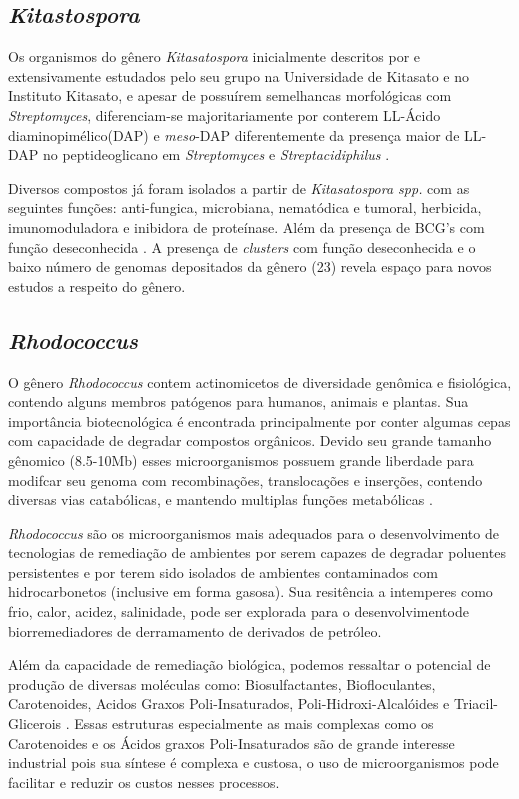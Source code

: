 \subsection{\textit{Kitastospora}}
Os organismos do gênero \textit{Kitasatospora} inicialmente descritos por  e extensivamente estudados pelo seu grupo na Universidade de Kitasato
e no Instituto Kitasato, e apesar de possuírem semelhancas morfológicas com \textit{Streptomyces}, 
diferenciam-se majoritariamente por conterem  LL-Ácido diaminopimélico(DAP) e \textit{meso}-DAP diferentemente da presença
maior de LL-DAP no peptideoglicano em \textit{Streptomyces} e \textit{Streptacidiphilus} \cite{yun2020genome}.

Diversos compostos já foram isolados a partir de \textit{Kitasatospora spp.} com as seguintes funções:
anti-fungica, microbiana, nematódica e tumoral, herbicida, imunomoduladora e inibidora de proteínase. Além da presença
de BCG's com função deseconhecida \cite{takahashi2017genus}. A presença de \textit{clusters} com função deseconhecida
e o baixo número de genomas depositados da gênero (23) \cite{schoch2020ncbi} revela espaço para novos estudos a respeito
do gênero. 

\subsection{\textit{Rhodococcus}}
O gênero \textit{Rhodococcus} contem actinomicetos de diversidade genômica e fisiológica,
contendo alguns membros patógenos para humanos, animais e plantas. Sua importância biotecnológica
é encontrada principalmente por conter algumas cepas com capacidade de degradar compostos orgânicos.
Devido seu grande tamanho gênomico (8.5-10Mb) esses microorganismos possuem grande liberdade
para modifcar seu genoma com recombinações, translocações e inserções, contendo diversas vias catabólicas,
e mantendo multiplas funções metabólicas \cite{cappelletti2019}.

\textit{Rhodococcus} são os microorganismos mais adequados para o desenvolvimento de
tecnologias de remediação de ambientes por serem capazes de degradar poluentes persistentes e por
terem sido isolados de ambientes contaminados com hidrocarbonetos 
(inclusive em forma gasosa)\cite{kuyukina2019}. Sua resitência a intemperes como frio, calor, acidez,
salinidade, pode ser explorada para o desenvolvimentode biorremediadores de derramamento de derivados
de petróleo.

Além da capacidade de remediação biológica, podemos ressaltar o potencial de produção de diversas moléculas
como: Biosulfactantes, Biofloculantes, Carotenoides, Acidos Graxos Poli-Insaturados, Poli-Hidroxi-Alcalóides e
Triacil-Glicerois \cite{cappelletti2020}. Essas estruturas especialmente as mais complexas como os
Carotenoides e os Ácidos graxos Poli-Insaturados são de grande interesse industrial pois sua síntese 
é complexa e custosa, o uso de microorganismos pode facilitar e reduzir os custos nesses processos.

